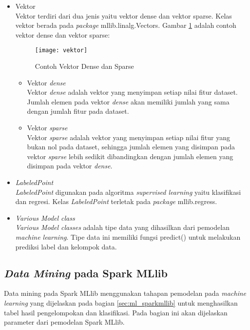 \begin{itemize}
\item Vektor\\
Vektor terdiri dari dua jenis yaitu vektor dense dan vektor sparse. Kelas vektor berada pada \textit{package} mllib.linalg.Vectors. Gambar \ref{fig:vektor} adalah contoh vektor dense dan vektor sparse:

\begin{figure}[H]
	\centering
	\texttt{[image: vektor]}
	\caption{Contoh Vektor Dense dan Sparse}
	\label{fig:vektor}
\end{figure}

\begin{itemize}

\item Vektor \textit{dense}\\
Vektor \textit{dense} adalah vektor yang menyimpan setiap nilai fitur dataset. Jumlah elemen pada vektor \textit{dense} akan memiliki jumlah yang sama dengan jumlah fitur pada dataset.

\item Vektor \textit{sparse}\\
Vektor \textit{sparse} adalah vektor yang menyimpan setiap nilai fitur yang bukan nol pada dataset, sehingga jumlah elemen yang disimpan pada vektor \textit{sparse} lebih sedikit dibandingkan dengan jumlah elemen yang disimpan pada vektor \textit{dense}. 

\end{itemize}

\item \textit{LabeledPoint}\\
\textit{LabeledPoint} digunakan pada algoritma \textit{supervised learning} yaitu klasifikasi dan regresi. Kelas \textit{LabeledPoint} terletak pada \textit{package} mllib.regress.

\item \textit{Various Model class}\\
\textit{Various Model classes} adalah tipe data yang dihasilkan dari pemodelan \textit{machine learning}. Tipe data ini memiliki fungsi predict() untuk melakukan prediksi label dan kelompok data.

\end{itemize}

\subsection{\textit{Data Mining} pada Spark MLlib}
Data mining pada Spark MLlib menggunakan tahapan pemodelan pada \textit{machine learning} yang dijelaskan pada bagian \ref{sec:ml_sparkmllib} untuk menghasilkan tabel hasil pengelompokan dan klasifikasi. Pada bagian ini akan dijelaskan parameter dari pemodelan Spark MLlib.

